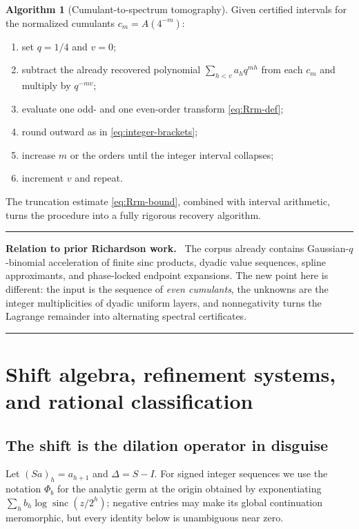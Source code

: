 \documentclass[11pt,oneside]{article}
\numberwithin{equation}{section}
\theoremstyle{definition}
\newtheorem{algorithm}[theorem]{Algorithm}
\theoremstyle{remark}
\newcommand{\sinc}{\operatorname{sinc}}
\newenvironment{statusbox}[1]{%
  \par\medskip\noindent\begin{center}\begin{minipage}{0.94\textwidth}%
  \color{linkblue}\hrule\vspace{0.65em}%
  \color{black}\textbf{\color{linkblue}#1.}\ }{%
  \par\vspace{0.65em}\color{linkblue}\hrule
  \end{minipage}\end{center}\medskip}
\begin{document}
\begin{algorithm}[Cumulant-to-spectrum tomography]
\label{alg:tomography}
Given certified intervals for the normalized cumulants $c_m=A(4^{-m})$:
\begin{enumerate}
\item set $q=1/4$ and $v=0$;
\item subtract the already recovered polynomial
      $\sum_{h<v}a_hq^{mh}$ from each $c_m$ and multiply by $q^{-mv}$;
\item evaluate one odd- and one even-order transform \eqref{eq:Rrm-def};
\item round outward as in \eqref{eq:integer-brackets};
\item increase $m$ or the orders until the integer interval collapses;
\item increment $v$ and repeat.
\end{enumerate}
The truncation estimate \eqref{eq:Rrm-bound}, combined with interval arithmetic, turns the
procedure into a fully rigorous recovery algorithm.
\end{algorithm}

\begin{statusbox}{Relation to prior Richardson work}
The corpus already contains Gaussian-$q$-binomial acceleration of finite sinc products,
dyadic value sequences, spline approximants, and phase-locked endpoint expansions.  The new
point here is different: the input is the sequence of \emph{even cumulants}, the unknowns are
the integer multiplicities of dyadic uniform layers, and nonnegativity turns the Lagrange
remainder into alternating spectral certificates.
\end{statusbox}


\section{Shift algebra, refinement systems, and rational classification}
\label{sec:shift}

\subsection{The shift is the dilation operator in disguise}

Let $(Sa)_h=a_{h+1}$ and $\Delta=S-I$.  For signed integer sequences we use the notation
$\Phi_b$ for the analytic germ at the origin obtained by exponentiating
$\sum_hb_h\log\sinc(z/2^h)$; negative entries may make its global continuation
meromorphic, but every identity below is unambiguous near zero.
\end{document}
